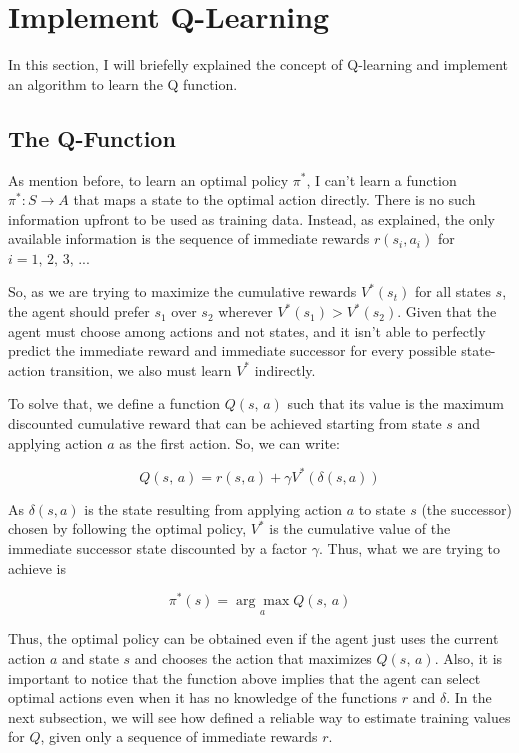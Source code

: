 \documentclass[a4paper]{article}
\begin{document}
\section{Implement Q-Learning}
\label{sec:implement_q_learning}
In this section, I will briefelly explained the concept of Q-learning and implement an algorithm to learn the Q function.

\subsection{The Q-Function}
As mention before, to learn an optimal policy $\pi^{*}$, I can't learn a function $\pi^{*}: S \rightarrow A$ that maps a state to the optimal action directly. There is no such information upfront to be used as training data. Instead, as \cite{Mitchell} explained, the only available information is the sequence of immediate rewards $r(s_i, a_i)$ for $i=1,\, 2,\, 3,\,...$

So, as we are trying to maximize the cumulative rewards $V^{*}(s_t)$ for all states $s$, the agent should prefer $s_1$ over $s_2$ wherever $V^{*}(s_1) > V^{*}(s_2)$. Given that the agent must choose among actions and not states, and it isn't able to perfectly predict the immediate reward and immediate successor for every possible state-action transition, we also must learn $V^{*}$ indirectly.

To solve that, we define a function $Q(s, \, a)$ such that its value is the maximum discounted cumulative reward that can be achieved starting from state $s$ and applying action $a$ as the first action. So, we can write:

$$Q(s, \, a) = r(s, a) + \gamma V^{*}(\delta(s, a))$$

As $\delta(s, a)$ is the state resulting from applying action $a$ to state $s$ (the successor) chosen by following the optimal policy, $V^{*}$ is the cumulative value of the immediate successor state discounted by a factor $\gamma$. Thus,  what we are trying to achieve is

$$\pi^{*}(s) = \underset{a}{\arg \max} Q(s, \, a)$$

Thus, the optimal policy can be obtained even if the agent just uses the current action $a$ and state $s$ and chooses the action that maximizes $Q(s,\, a)$. Also, it is important to notice that the function above implies that the agent can select optimal actions even when it has no knowledge of the functions $r$ and $\delta$. In the next subsection, we will see how \cite{Mitchell} defined a reliable way to estimate training values for $Q$, given only a sequence of immediate rewards $r$.
\end{document}
